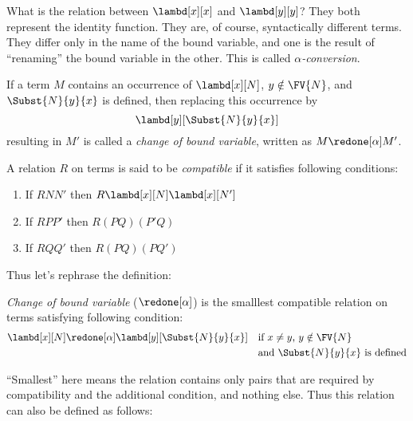 \documentclass[../../../include/open-logic-section]{subfiles}
\begin{document}

What is the relation between $\lambd[x][x]$ and $\lambd[y][y]$? They
both represent the identity function. They are, of course,
syntactically different terms. They differ only in the name of the
bound variable, and one is the result of ``renaming'' the bound
variable in the other. This is called \emph{$\alpha$-conversion}.

\begin{defn}
  If a term $M$ contains an occurrence of $\lambd[x][N]$, $y \notin
  \FV{N}$, and $\Subst{N}{y}{x}$ is defined, then replacing this occurrence
  by 
  \begin{equation*}
    \lambd[y][\Subst{N}{y}{x}]
  \end{equation*}
  resulting in $M'$ is called a \emph{change of bound variable}, written
  as $M \redone[\alpha] M'$.
\end{defn}

\begin{defn}
  A relation $R$ on terms is said to be \emph{compatible}
  if it satisfies following conditions:
  \begin{enumerate}
  \item If $R N N'$ then $R \lambd[x][N] \lambd[x][N']$
  \item If $R P P'$ then $R (PQ) (P'Q)$
  \item If $R Q Q'$ then $R (PQ) (PQ')$
  \end{enumerate}
\end{defn}

Thus let's rephrase the definition:
\begin{defn}
  \emph{Change of bound variable} ($\redone[\alpha]$) is 
  the smalllest compatible relation on terms satisfying following
  condition:
  \begin{align*}
    &\lambd[x][N] \redone[\alpha] \lambd[y][\Subst{N}{y}{x}] && \text{if
      $x \neq y$, $y \notin \FV{N}$} \\
    & &&\text{and $\Subst{N}{y}{x}$ is defined}
  \end{align*}
\end{defn}

``Smallest'' here means the relation contains only pairs that are required by
compatibility and the additional condition, and nothing else. Thus
this relation can also be defined as follows:
\end{document}
